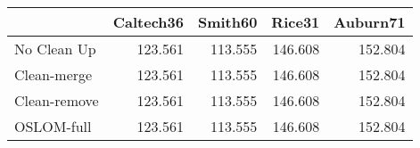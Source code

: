 \begin{tabular}{lrrrr}
\toprule
{} & Caltech36 & Smith60 &  Rice31 & Auburn71 \\
\midrule
No Clean Up  &   123.561 & 113.555 & 146.608 &  152.804 \\
Clean-merge  &   123.561 & 113.555 & 146.608 &  152.804 \\
Clean-remove &   123.561 & 113.555 & 146.608 &  152.804 \\
OSLOM-full   &   123.561 & 113.555 & 146.608 &  152.804 \\
\bottomrule
\end{tabular}
